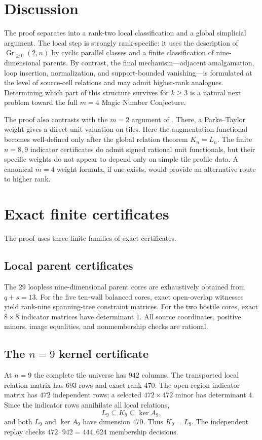 \documentclass[11pt]{article}
\newcommand{\Gr}{\operatorname{Gr}}
\newcommand{\1}{\mathbf 1}
\begin{document}
\section{Discussion}

The proof separates into a rank-two local classification and a global
simplicial argument.  The local step is strongly rank-specific: it uses
the description of $\Gr_{\ge0}(2,n)$ by cyclic parallel classes and a
finite classification of nine-dimensional parents.  By contrast, the
final mechanism---adjacent amalgamation, loop insertion, normalization,
and support-bounded vanishing---is formulated at the level of source-cell
relations and may admit higher-rank analogues.  Determining which part of
this structure survives for $k\ge3$ is a natural next problem toward the
full $m=4$ Magic Number Conjecture.

The proof also contrasts with the $m=2$ argument of
\cite{M2Magic}.  There, a Parke--Taylor weight gives a direct unit valuation
on tiles.  Here the augmentation functional becomes well-defined only
after the global relation theorem $K_n=L_n$.  The finite $n=8,9$ indicator
certificates do admit signed rational unit functionals, but their specific
weights do not appear to depend only on simple tile profile data.  A
canonical $m=4$ weight formula, if one exists, would provide an alternative
route to higher rank.

\appendix

\section{Exact finite certificates}\label{app:certificates}

The proof uses three finite families of exact certificates.

\subsection{Local parent certificates}
The $29$ loopless nine-dimensional parent cores are exhaustively obtained
from $q+s=13$.  For the five ten-wall balanced cores, exact open-overlap
witnesses yield rank-nine spanning-tree constraint matrices.  For the two
hostile cores, exact $8\times8$ indicator matrices have determinant $1$.
All source coordinates, positive minors, image equalities, and
nonmembership checks are rational.

\subsection{The \texorpdfstring{$n=9$}{n=9} kernel certificate}
At $n=9$ the complete tile universe has $942$ columns.  The transported
local relation matrix has $693$ rows and exact rank $470$.  The open-region
indicator matrix has $472$ independent rows; a selected
$472\times472$ minor has determinant $4$.  Since the indicator rows
annihilate all local relations,
\[
L_9\subseteq K_9\subseteq\ker A_9,
\]
and both $L_9$ and $\ker A_9$ have dimension $470$.  Thus $K_9=L_9$.
The independent replay checks $472\cdot942=444{,}624$ membership decisions.
\end{document}

